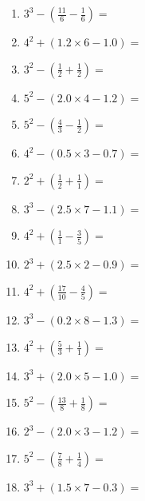 \documentclass[12pt]{article}
\begin{document}
\begin{enumerate}
\item \large $ 3^{3} - (\frac{11}{6} - \frac{1}{6}) = $ \vspace{1.6cm}
\item \large $ 4^{2} + (1.2 \times 6 - 1.0) = $ \vspace{1.6cm}
\item \large $ 3^{2} - (\frac{1}{2} + \frac{1}{2}) = $ \vspace{1.6cm}
\item \large $ 5^{2} - (2.0 \times 4 - 1.2) = $ \vspace{1.6cm}
\newpage
\item \large $ 5^{2} - (\frac{4}{3} - \frac{1}{2}) = $ \vspace{1.6cm}
\item \large $ 4^{2} - (0.5 \times 3 - 0.7) = $ \vspace{1.6cm}
\item \large $ 2^{2} + (\frac{1}{2} + \frac{1}{1}) = $ \vspace{1.6cm}
\item \large $ 3^{3} - (2.5 \times 7 - 1.1) = $ \vspace{1.6cm}
\item \large $ 4^{2} + (\frac{1}{1} - \frac{3}{5}) = $ \vspace{1.6cm}
\item \large $ 2^{3} + (2.5 \times 2 - 0.9) = $ \vspace{1.6cm}
\item \large $ 4^{2} + (\frac{17}{10} - \frac{4}{5}) = $ \vspace{1.6cm}
\item \large $ 3^{3} - (0.2 \times 8 - 1.3) = $ \vspace{1.6cm}
\item \large $ 4^{2} + (\frac{5}{3} + \frac{1}{1}) = $ \vspace{1.6cm}
\item \large $ 3^{3} + (2.0 \times 5 - 1.0) = $ \vspace{1.6cm}
\newpage
\item \large $ 5^{2} - (\frac{13}{8} + \frac{1}{8}) = $ \vspace{1.6cm}
\item \large $ 2^{3} - (2.0 \times 3 - 1.2) = $ \vspace{1.6cm}
\item \large $ 5^{2} - (\frac{7}{8} + \frac{1}{4}) = $ \vspace{1.6cm}
\item \large $ 3^{3} + (1.5 \times 7 - 0.3) = $ \vspace{1.6cm}

\end{enumerate}
\end{document}
